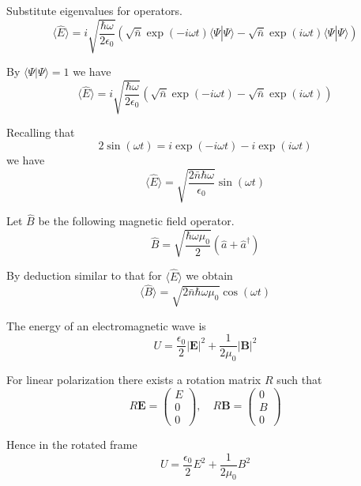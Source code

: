 Substitute eigenvalues for operators.
\begin{equation*}
\langle\hat E\rangle
=i\sqrt{\frac{\hbar\omega}{2\epsilon_0}}
\left(\sqrt{\bar n}\exp(-i\omega t)\langle\Psi|\Psi\rangle-\sqrt{\bar n}\exp(i\omega t)\langle\Psi|\Psi\rangle\right)
\end{equation*}

By $\langle\Psi|\Psi\rangle=1$ we have
\begin{equation*}
\langle\hat E\rangle
=i\sqrt{\frac{\hbar\omega}{2\epsilon_0}}
\left(\sqrt{\bar n}\exp(-i\omega t)-\sqrt{\bar n}\exp(i\omega t)\right)
\end{equation*}

Recalling that
\begin{equation*}
2\sin(\omega t)=i\exp(-i\omega t)-i\exp(i\omega t)
\end{equation*}
we have
\begin{equation*}
\langle\hat E\rangle=\sqrt{\frac{2\bar n\hbar\omega}{\epsilon_0}}\sin(\omega t)
\end{equation*}

Let $\hat B$ be the following magnetic field operator.
\begin{equation*}
\hat B=\sqrt{\frac{\hbar\omega\mu_0}{2}}
(\hat a+\hat a^\dag)
\end{equation*}

By deduction similar to that for $\langle\hat E\rangle$ we obtain
\begin{equation*}
\langle\hat B\rangle=\sqrt{2\bar n\hbar\omega\mu_0}\cos(\omega t)
\end{equation*}

The energy of an electromagnetic wave is
\begin{equation*}
U=\frac{\epsilon_0}{2}|\mathbf E|^2+\frac{1}{2\mu_0}|\mathbf B|^2
\end{equation*}

For linear polarization there exists a rotation matrix $R$ such that
\begin{equation*}
R\mathbf E=\begin{pmatrix}E\\0\\0\end{pmatrix},
\quad
R\mathbf B=\begin{pmatrix}0\\B\\0\end{pmatrix}
\end{equation*}

Hence in the rotated frame
\begin{equation*}
U=\frac{\epsilon_0}{2}E^2+\frac{1}{2\mu_0}B^2
\end{equation*}

